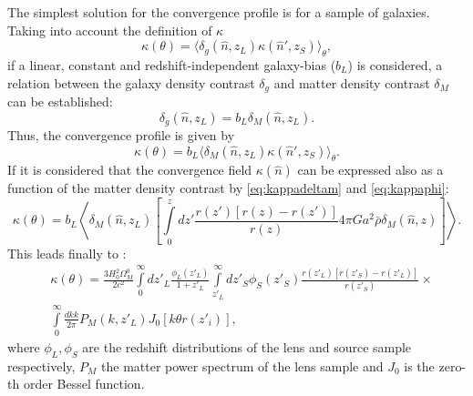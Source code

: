 The simplest solution for the convergence profile is for a sample of galaxies. Taking into account the definition of $\kappa$
\begin{equation}
\kappa(\theta) = \langle\delta_g(\hat n,z_L)\kappa(\hat n',z_S)\rangle_\theta,
\end{equation}
if a linear, constant and redshift-independent galaxy-bias ($b_L$) is considered, a relation between the galaxy density contrast $\delta_g$ and matter density contrast $\delta_M$ can be established:
\begin{equation}
\delta_g(\hat n,z_L) = b_L\delta_M(\hat n,z_L).
\end{equation}
Thus, the convergence profile is given by
\begin{equation}
\kappa(\theta) = b_L\langle\delta_M(\hat n,z_L)\kappa(\hat n',z_S)\rangle_\theta.
\end{equation}
If it is considered that the convergence field $\kappa(\hat n)$ can be expressed also as a function of the matter density contrast by \autoref{eq:kappadeltam} and \autoref{eq:kappaphi}:
\begin{equation}
\kappa(\theta) = b_L\left\langle\delta_M(\hat n,z_L)\left[\int\limits_0^zdz'\frac{r(z')[r(z)-r(z')]}{r(z)}4\pi Ga^2\bar\rho\delta_M(\hat n,z)\right]\right\rangle.
\end{equation}
This leads finally to \cite{2003A&A...403..817M}:
\begin{eqnarray}
&\kappa(\theta)=\frac{3H_0^2\Omega_M^0}{2c^2}\int\limits_0^\infty dz'_L\frac{\phi_L(z'_L)}{1+z'_L}\int\limits_{z'_L}^\infty dz'_S\phi_S(z'_S)\frac{r(z'_L)[r(z'_S)-r(z'_L)]}{r(z'_S)}\times\label{eq:omega0}\\
&\int\limits_0^\infty\frac{dkk}{2\pi}P_M(k,z'_L)J_0[k\theta r(z'_i)],\nonumber
\end{eqnarray}
where $\phi_L,\phi_S$ are the redshift distributions of the lens and source sample respectively, $P_M$ the matter power spectrum of the lens sample and $J_0$ is the zero-th order Bessel function.
\newline

